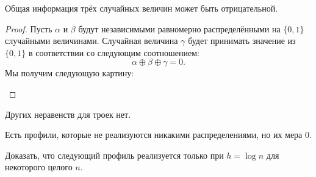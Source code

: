 \documentclass[12pt]{article}
\begin{document}
\begin{statement}
    Общая информация трёх случайных величин может быть отрицательной.
\end{statement}
\begin{proof}
    Пусть $\alpha$ и $\beta$ будут независимыми равномерно распределёнными на $\{0,1\}$ случайными
    величинами. Случайная величина $\gamma$ будет принимать значение из $\{0,1\}$ в соответствии со
    следующим соотношением:
    \[
        \alpha\oplus\beta\oplus\gamma = 0.
    \]
    Мы получим следующую картину:

    \begin{center}
    \end{center}

\end{proof}
\begin{statement}
    Других неравенств для троек нет.
\end{statement}
\begin{statement}
        Есть профили, которые не реализуются никакими распределениями, но их мера 0.
\end{statement}
\begin{exercise}
    Доказать, что следующий профиль реализуется только при $h=\log n$ для некоторого целого $n$.
    \begin{center}
    \end{center}
\end{exercise}
\end{document}
